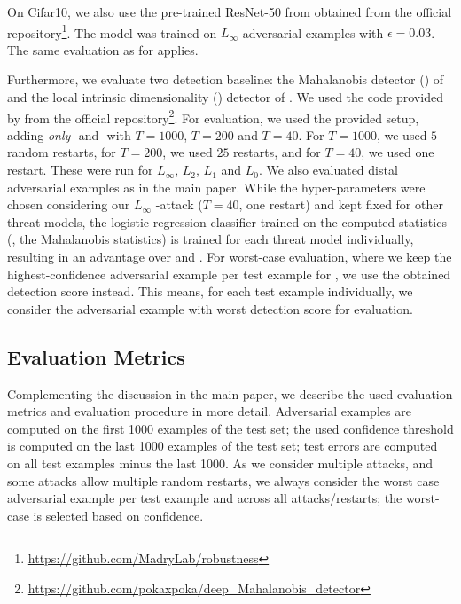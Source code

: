 On Cifar10, we also use the pre-trained ResNet-50 from \cite{MadryICLR2018} obtained from the official repository\footnote{\url{https://github.com/MadryLab/robustness}}. The model was trained on $L_\infty$ adversarial examples with $\epsilon = 0.03$. The same evaluation as for \ConfTrain applies.

Furthermore, we evaluate two detection baseline: the Mahalanobis detector (\Lee) of \cite{MaICLR2018} and the local intrinsic dimensionality (\Ma) detector of \cite{LeeNIPS2018}.
We used the code provided by \cite{LeeNIPS2018} from the official repository\footnote{\url{https://github.com/pokaxpoka/deep_Mahalanobis_detector}}. For evaluation, we used the provided setup, adding \emph{only} \PGD-\FCE and \PGD-\FConf with $T=1000$, $T=200$ and $T = 40$. For $T=1000$, we used $5$ random restarts, for $T=200$, we used $25$ restarts, and for $T = 40$, we used one restart. These were run for $L_\infty$, $L_2$, $L_1$ and $L_0$. We also evaluated distal adversarial examples as in the main paper. While the hyper-parameters were chosen considering our $L_\infty$ \PGD-\FCE attack ($T = 40$, one restart) and kept fixed for other threat models, the logistic regression classifier trained on the computed statistics (\eg, the Mahalanobis statistics) is trained for each threat model individually, resulting in an advantage over \AdvTrain and \ConfTrain. For worst-case evaluation, where we keep the highest-confidence adversarial example per test example for \ConfTrain, we use the obtained detection score instead. This means, for each test example individually, we consider the adversarial example with worst detection score for evaluation.

\subsection{Evaluation Metrics}
\label{subsec:supp-experiments-evaluation}

Complementing the discussion in the main paper, we describe the used evaluation metrics and evaluation procedure in more detail. Adversarial examples are computed on the first 1000 examples of the test set; the used confidence threshold is computed on the last 1000 examples of the test set; test errors are computed on all test examples minus the last 1000. As we consider multiple attacks, and some attacks allow multiple random restarts, we always consider the worst case adversarial example per test example and across all attacks/restarts; the worst-case is selected based on confidence.

